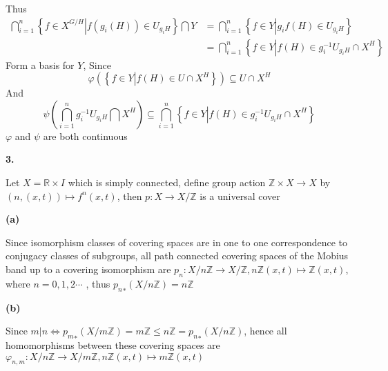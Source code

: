 \documentclass[12pt]{article}
\begin{document}
Thus
\[
\begin{aligned}
\bigcap_{i=1}^n\left\{f\in X^{G/H}\left|f(g_i(H))\in U_{g_iH}\right.\right\}\bigcap Y
&=\bigcap_{i=1}^n\left\{f\in Y\left|g_if(H)\in U_{g_iH}\right.\right\} \\
&=\bigcap_{i=1}^n\left\{f\in Y\left|f(H)\in g_i^{-1}U_{g_iH}\cap X^H\right.\right\}
\end{aligned}
\]
Form a basis for $Y$, Since
\[
\varphi\left(\left\{f\in Y\left|f(H)\in U\cap X^H\right.\right\}\right)\subseteq U\cap X^H
\]
And
\[
\psi\left(\bigcap_{i=1}^n g_i^{-1}U_{g_iH}\bigcap X^H\right)\subseteq\bigcap_{i=1}^n\left\{f\in Y\left|f(H)\in g_i^{-1}U_{g_iH}\cap X^H\right.\right\}
\]
$\varphi$ and $\psi$ are both continuous \par
\textbf{3.} \par
Let $X=\mathbb{R}\times I$ which is simply connected, define group action $\mathbb{Z}\times X\rightarrow X$ by $(n,(x,t))\mapsto f^n(x,t)$, then $p:X\rightarrow X/\mathbb{Z}$ is a universal cover \par
\textbf{(a)} \par
Since isomorphism classes of covering spaces are in one to one correspondence to conjugacy classes of subgroups, all path connected covering spaces of the Mobius band up to a covering isomorphism are $p_n:X/n\mathbb{Z}\rightarrow X/\mathbb{Z}, n\mathbb{Z}(x,t)\mapsto \mathbb{Z}(x,t)$, where $n=0,1,2\cdots$ , thus ${p_n}_{*}(X/n\mathbb{Z})=n\mathbb{Z}$\par
\textbf{(b)} \par
Since $m|n \Leftrightarrow {p_m}_{*}(X/m\mathbb{Z})=m\mathbb{Z}\leq n\mathbb{Z}={p_n}_{*}(X/n\mathbb{Z})$, hence all homomorphisms between these covering spaces are $\varphi_{n,m}:X/n\mathbb{Z}\rightarrow X/m\mathbb{Z}, n\mathbb{Z}(x,t)\mapsto m\mathbb{Z}(x,t)$
\end{document}
